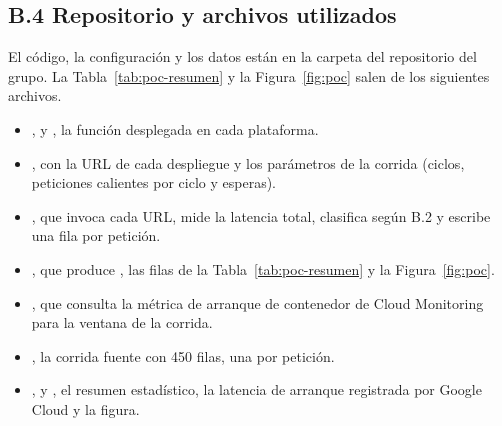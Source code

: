 \documentclass[12pt, letterpaper, table, xcdraw]{inf-pucv}
\begin{document}
\subsection*{B.4 Repositorio y archivos utilizados}

El código, la configuración y los datos están en la carpeta  del
repositorio del grupo. La Tabla~\ref{tab:poc-resumen} y la Figura~\ref{fig:poc} salen
de los siguientes archivos.

\begin{itemize}
    \item {},  y
          , la función desplegada en cada plataforma.
    \item {}, con la URL de cada despliegue y los parámetros de la
          corrida (ciclos, peticiones calientes por ciclo y esperas).
    \item {}, que invoca cada URL, mide la latencia total,
          clasifica según B.2 y escribe una fila por petición.
    \item {}, que produce , las
          filas de la Tabla~\ref{tab:poc-resumen} y la Figura~\ref{fig:poc}.
    \item {}, que consulta la métrica de arranque de
          contenedor de Cloud Monitoring para la ventana de la corrida.
    \item {}, la corrida fuente con
          450 filas, una por petición.
    \item {},  y
          , el resumen estadístico, la latencia de
          arranque registrada por Google Cloud y la figura.
\end{itemize}

\clearpage


\end{document}
